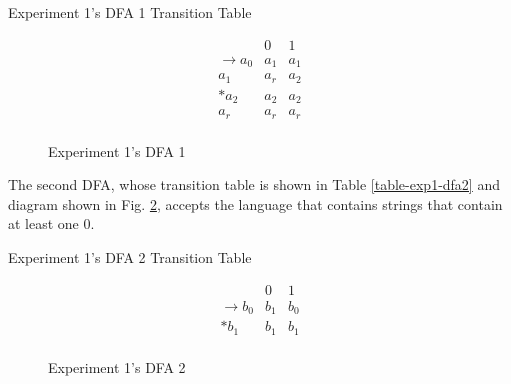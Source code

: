 \documentclass[conference]{IEEEtran}
\begin{document}
\begin{table}[h!]
    \caption{Experiment 1's DFA 1 Transition Table}
    \begin{displaymath}
        \begin{array}{r|c|c|}
        & 0 & 1 \\
        \hline
        \rightarrow a_0 & a_1 & a_1 \\
        a_1 & a_r & a_2 \\
        * a_2 & a_2 & a_2 \\
        a_r & a_r & a_r \\
        \end{array}
    \end{displaymath}
    \label{table-exp1-dfa1}
\end{table}
\begin{figure}[h!]
    \centering
    \caption{Experiment 1's DFA 1}
    \label{fig-exp1-dfa1}
\end{figure}

The second DFA, whose transition table is shown in Table \ref{table-exp1-dfa2} and diagram shown in Fig. \ref{fig-exp1-dfa2}, accepts the language that contains strings that contain at least one 0.

\begin{table}[h!]
    \caption{Experiment 1's DFA 2 Transition Table}
    \begin{displaymath}
        \begin{array}{r|c|c|}
        & 0 & 1 \\
        \hline
        \rightarrow b_0 & b_1 & b_0 \\
        * b_1 & b_1 & b_1 \\
        \end{array}
    \end{displaymath}
    \label{table-exp1-dfa2}
\end{table}
\begin{figure}[h!]
    \centering
    \caption{Experiment 1's DFA 2}
    \label{fig-exp1-dfa2}
\end{figure}
\end{document}
